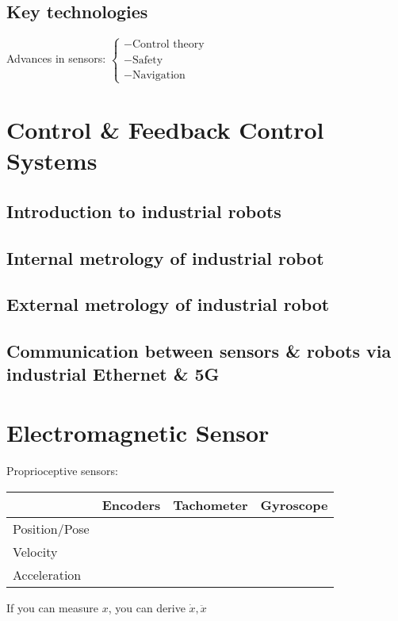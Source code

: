 \subsection{Key technologies}
Advances in sensors: $\begin{cases}
	- \text{Control theory}\\
	- \text{Safety}\\
	- \text{Navigation}
\end{cases}$


\section{Control \& Feedback Control Systems}
\subsection{Introduction to industrial robots}
\subsection{Internal metrology of industrial robot}
\subsection{External metrology of industrial robot}
\subsection{Communication between sensors \& robots via industrial Ethernet \& 5G}

\section{Electromagnetic Sensor}
Proprioceptive sensors:
\begin{table}[hbt!]
	\centering
	\begin{tabular}{l|c|c|c}
		& Encoders & Tachometer & Gyroscope\\ \hline\hline
		Position/Pose & \checkmark &\\\hline
		Velocity & \checkmark & \checkmark\\\hline
		Acceleration & \checkmark & \checkmark & \checkmark
	\end{tabular}
\end{table}

\note If you can measure $x$, you can derive $\dot{x}, \ddot{x}$
